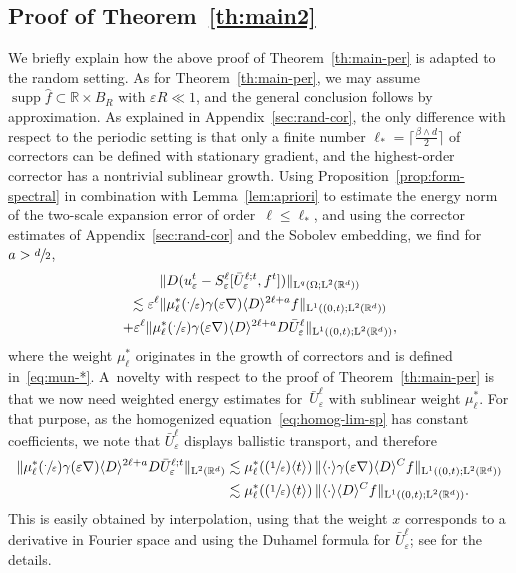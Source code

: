 \documentclass[JEP,XML,SOM,Unicode,published]{cedram}
\newcommand{\Psfrac}[2]{(\sfrac{#1}{#2})}
\theoremstyle{plain}
\theoremstyle{definition}
\numberwithin{equation}{section}
\newcommand{\e}{\varepsilon}
\newcommand{\R}{\mathbb R}
\newcommand{\Ld}{\operatorname{L}}
\newcommand{\supp}{\operatorname{supp}}
\begin{document}
\subsection{Proof of Theorem~\ref{th:main2}}\label{sec:proof-random}
We briefly explain how the above proof of Theorem~\ref{th:main-per} is adapted to the random setting.
As for Theorem~\ref{th:main-per}, we may assume $\supp\hat f\subset\R\times B_R$ with $\e R\ll1$, and the general conclusion follows by approximation.
As explained in Appendix~\ref{sec:rand-cor}, the only difference with respect to the periodic setting is that only a finite number $\ell_*=\lceil\frac{\beta\wedge d}2\rceil$ of correctors can be defined with stationary gradient, and the highest-order corrector has a nontrivial sublinear growth.
Using Proposition~\ref{prop:form-spectral} in combination with Lemma~\ref{lem:apriori} to estimate the energy norm of the two-scale expansion error of order~$\ell\le\ell_*$, and using the corrector estimates of Appendix~\ref{sec:rand-cor} and the Sobolev embedding, we find for $a>\sfrac d2$,
\begin{multline*}
\|D(u_\e^t-S_\e^{\ell}[\bar U_\e^{\ell;t},f^t])\|_{\Ld^q(\Omega;\Ld^2(\R^d))}\\
\lesssim
\e^{\ell}\|\mu_\ell^*(\sfrac\cdot\e)\gamma(\e\nabla)\langle D\rangle^{2\ell+a}f\|_{\Ld^1((0,t);\Ld^2(\R^d))}\\
+\e^{\ell}\|\mu_\ell^*(\sfrac\cdot\e)\gamma(\e\nabla)\langle D\rangle^{2\ell+a}D\bar U_\e^{\ell}\|_{\Ld^1((0,t);\Ld^2(\R^d))},
\end{multline*}
where the weight $\mu_\ell^*$ originates in the growth of correctors and is defined in~\eqref{eq:mun-*}.
A~novelty with respect to the proof of Theorem~\ref{th:main-per} is that we now need weighted energy estimates for~$\bar U_\e^{\ell}$ with sublinear weight $\mu_\ell^*$.
For that purpose, as the homogenized equation~\eqref{eq:homog-lim-sp} has constant coefficients,
we note that $\bar U_\e^{\ell}$ displays ballistic transport, and therefore
\begin{align*}
\|\mu_\ell^*(\sfrac\cdot\e)\gamma(\e\nabla)\langle D\rangle^{2\ell+a}D\bar U_\e^{\ell;t}\|_{\Ld^2(\R^d)}
&\lesssim\mu_\ell^*(\Psfrac{1}\e\langle t\rangle)\,\|\langle\cdot\rangle\gamma(\e\nabla)\langle D\rangle^{C}f\|_{\Ld^1((0,t);\Ld^2(\R^d))}\\
&\lesssim\mu_\ell^*(\Psfrac{1}\e\langle t\rangle)\,\|\langle\cdot\rangle\langle D\rangle^{C}f\|_{\Ld^1((0,t);\Ld^2(\R^d))}.
\end{align*}
This is easily obtained by interpolation, using that the weight $x$ corresponds to a derivative in Fourier space and using the Duhamel formula for $\bar U_\e^{\ell}$; see \eg \cite[Proof of Prop.\,3]{BG} for the details.
\end{document}
